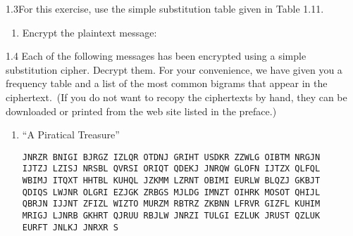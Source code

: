 \begin{exercise}
    {1.3}For this exercise, use the simple substitution table given in Table 1.11.
    \begin{enumerate}
        \item Encrypt the plaintext message:
    \end{enumerate}
\end{exercise}


\begin{exercise}
    {1.4} Each of the following messages has been encrypted using a simple substitution cipher. Decrypt them. For your convenience, we have given you a frequency table and a list of the most common bigrams that appear in the ciphertext.\ (If you do not want to recopy the ciphertexts by hand, they can be downloaded or printed from the web site listed in the preface.)
    \begin{enumerate}
        \item “A Piratical Treasure”
              \begin{flushleft}
                  \texttt{JNRZR BNIGI BJRGZ IZLQR OTDNJ GRIHT USDKR ZZWLG OIBTM NRGJN} \\
                  \texttt{IJTZJ LZISJ NRSBL QVRSI ORIQT QDEKJ JNRQW GLOFN IJTZX QLFQL} \\
                  \texttt{WBIMJ ITQXT HHTBL KUHQL JZKMM LZRNT OBIMI EURLW BLQZJ GKBJT} \\
                  \texttt{QDIQS LWJNR OLGRI EZJGK ZRBGS MJLDG IMNZT OIHRK MOSOT QHIJL} \\
                  \texttt{QBRJN IJJNT ZFIZL WIZTO MURZM RBTRZ ZKBNN LFRVR GIZFL KUHIM} \\
                  \texttt{MRIGJ LJNRB GKHRT QJRUU RBJLW JNRZI TULGI EZLUK JRUST QZLUK} \\
                  \texttt{EURFT JNLKJ JNRXR S}
              \end{flushleft}
    \end{enumerate}
\end{exercise}


